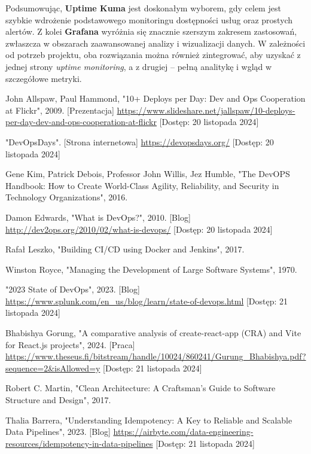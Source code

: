 \documentclass{article}
\begin{document}
Podsumowując, \textbf{Uptime Kuma} jest doskonałym wyborem, gdy celem jest szybkie wdrożenie podstawowego monitoringu dostępności usług oraz prostych alertów. Z kolei \textbf{Grafana} wyróżnia się znacznie szerszym zakresem zastosowań, zwłaszcza w obszarach zaawansowanej analizy i wizualizacji danych. W zależności od potrzeb projektu, oba rozwiązania można również zintegrować, aby uzyskać z jednej strony \emph{uptime monitoring}, a z drugiej -- pełną analitykę i wgląd w szczegółowe metryki. 


\begin{thebibliography}{9}

John Allspaw, Paul Hammond, "10+ Deploys per Day: Dev and Ops Cooperation at Flickr", 2009. [Prezentacja] \url{https://www.slideshare.net/jallspaw/10-deploys-per-day-dev-and-ops-cooperation-at-flickr} [Dostęp: 20 listopada 2024]

"DevOpsDays". [Strona internetowa] \url{https://devopsdays.org/} [Dostęp: 20 listopada 2024]

Gene Kim, Patrick Debois, Professor John Willis, Jez Humble, "The DevOPS Handbook: How to Create World-Class Agility, Reliability, and Security in Technology Organizations", 2016.

Damon Edwards, "What is DevOps?", 2010. [Blog] \url{http://dev2ops.org/2010/02/what-is-devops/} [Dostęp: 20 listopada 2024]

Rafał Leszko, "Building CI/CD using Docker and Jenkins", 2017.

Winston Royce, "Managing the Development of Large Software Systems", 1970.

"2023 State of DevOps", 2023. [Blog] \url{https://www.splunk.com/en_us/blog/learn/state-of-devops.html} [Dostęp: 21 listopada 2024]

Bhabishya Gorung, "A comparative analysis of create-react-app (CRA) and Vite for React.js projects", 2024. [Praca] \url{https://www.theseus.fi/bitstream/handle/10024/860241/Gurung_Bhabishya.pdf?sequence=2&isAllowed=y} [Dostęp: 21 listopada 2024]

Robert C. Martin, "Clean Architecture: A Craftsman's Guide to Software Structure and Design", 2017.

Thalia Barrera, "Understanding Idempotency: A Key to Reliable and Scalable Data Pipelines", 2023. [Blog] \url{https://airbyte.com/data-engineering-resources/idempotency-in-data-pipelines} [Dostęp: 21 listopada 2024]


\end{thebibliography}
\end{document}
